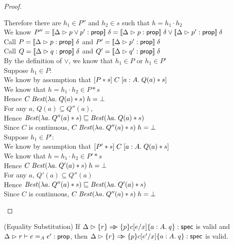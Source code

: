 \begin{proof}
\begin{tabbedproof}
    \oooooo Therefore there are $h_1 \in P''$ and $h_2 \in s$ such that $h = h_1 \cdot h_2$ \\
    \oooooo We know $P'' = [\![{{\Delta} \vartriangleright {p \vee p'} : {\mathsf{prop}}}]\!]\;\delta = 
                           [\![{{\Delta} \vartriangleright {p} : {\mathsf{prop}}}]\!]\;\delta \vee 
                           [\![{{\Delta} \vartriangleright {p'} : {\mathsf{prop}}}]\!]\;\delta$ \\ 
    \oooooo Call $P = [\![{{\Delta} \vartriangleright {p} : {\mathsf{prop}}}]\!]\;\delta$ and $P' = [\![{{\Delta} \vartriangleright {p'} : {\mathsf{prop}}}]\!]\;\delta$ \\
    \oooooo Call $Q = [\![{{\Delta} \vartriangleright {q} : {\mathsf{prop}}}]\!]\;\delta$ and $Q' = [\![{{\Delta} \vartriangleright {q'} : {\mathsf{prop}}}]\!]\;\delta$ \\
    \oooooo By the definition of $\vee$, we know that $h_1 \in P$ or $h_1 \in P'$ \\
    \oooooo Suppose $h_1 \in P$: \\
    \ooooooo We know by assumption that $[{P * s}]\;{C}\;[{a:A}.\;{Q(a) * s}]$ \\
    \ooooooo We know that $h = h_1 \cdot h_2 \in P * s$ \\
    \ooooooo Hence $C\;\mathit{Best}(\lambda a.\;Q(a) * s)\;h = \bot$ \\
    \ooooooo For any $a$, $Q(a) \subseteq Q''(a)$, \\
    \ooooooo Hence $\mathit{Best}(\lambda a.\;Q''(a) * s) \sqsubseteq \mathit{Best}(\lambda a.\;Q(a) * s)$ \\ 
    \ooooooo Since $C$ is continuous, $C\;\mathit{Best}(\lambda a.\;Q''(a) * s)\;h = \bot$ \\
    \oooooo Suppose $h_1 \in P'$: \\
    \ooooooo We know by assumption that $[{P' * s}]\;{C}\;[{a:A}.\;{Q(a) * s}]$ \\
    \ooooooo We know that $h = h_1 \cdot h_2 \in P' * s$ \\
    \ooooooo Hence $C\;\mathit{Best}(\lambda a.\;Q'(a) * s)\;h = \bot$ \\
    \ooooooo For any $a$, $Q'(a) \subseteq Q''(a)$ \\
    \ooooooo Hence $\mathit{Best}(\lambda a.\;Q''(a) * s) \sqsubseteq \mathit{Best}(\lambda a.\;Q'(a) * s)$ \\
    \ooooooo Since $C$ is continuous, $C\;\mathit{Best}(\lambda a.\;Q''(a) * s)\;h = \bot$ \\
  \end{tabbedproof}
\end{proof}

\begin{lemma}{(Equality Substitution)}
If ${\Delta} \vartriangleright {\{{r}\} \Rightarrow\!\!\!>\{{p}\}{c[e/x]}\{{a:A}.\;{q}\}} : \mathsf{spec}$ is valid and
${\Delta} \vartriangleright {r \vdash e =_A e'} : {\mathsf{prop}}$, then ${\Delta} \vartriangleright {\{{r}\} \Rightarrow\!\!\!>\{{p}\}{c[e'/x]}\{{a:A}.\;{q}\}} : \mathsf{spec}$ is valid.
\end{lemma}

